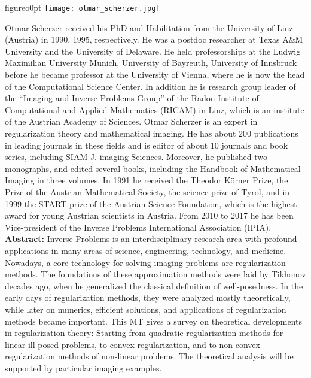 \begin{wrapfloat}{figure}{o}{0pt}
\texttt{[image: otmar\_scherzer.jpg]}
\end{wrapfloat}
Otmar Scherzer received his PhD and Habilitation from the University of Linz (Austria) in 1990, 1995, respectively. He was a postdoc researcher at Texas A\&M University and the University of Delaware. He held professorships at the Ludwig Maximilian University Munich, University of Bayreuth, University of Innsbruck before he became professor at the University of Vienna, where he is now the head of the Computational Science Center. In addition he is research group leader of the ``Imaging and Inverse Problems Group'' of the Radon Institute of Computational and Applied Mathematics (RICAM) in Linz, which is an institute of the Austrian Academy of Sciences. Otmar Scherzer is an expert in regularization theory and mathematical imaging. He has about 200 publications in leading journals in these fields and is editor of about 10 journals and book series, including SIAM J. imaging Sciences. Moreover, he published two monographs, and edited several books, including the Handbook of Mathematical Imaging in three volumes. In 1991 he received the Theodor K\"orner Prize, the Prize of the Austrian Mathematical Society, the science prize of Tyrol, and in 1999 the START-prize of the Austrian Science Foundation, which is the highest award for young Austrian scientists in Austria. From 2010 to 2017 he has been Vice-president of the Inverse Problems International Association (IPIA).\\

\textbf{Abstract:} 
Inverse Problems is an interdisciplinary research area with profound applications in many areas of science, engineering, technology, and medicine.
Nowadays, a core technology for solving imaging problems are
regularization methods. The foundations of these approximation methods were laid by Tikhonov decades ago, when he generalized the classical definition of well-posedness. 
In the early days of regularization methods, they were analyzed
mostly theoretically, while later on numerics, efficient solutions, 
and applications of regularization methods became important.
This MT gives a survey on theoretical developments in regularization 
theory: Starting from quadratic regularization methods for linear ill-posed 
problems, to convex regularization, and to non-convex regularization methods 
of non-linear problems. 
The theoretical analysis will be supported by particular 
imaging examples.
